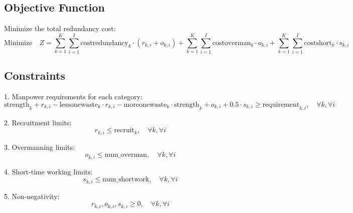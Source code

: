 \documentclass{article}
\begin{document}
\subsection*{Objective Function}
Minimize the total redundancy cost:
\[
\text{Minimize} \quad Z = \sum_{k=1}^{K} \sum_{i=1}^{I} \text{costredundancy}_{k} \cdot (r_{k,i} + o_{k,i}) + \sum_{k=1}^{K} \sum_{i=1}^{I} \text{costoverman}_{k} \cdot o_{k,i} + \sum_{k=1}^{K} \sum_{i=1}^{I} \text{costshort}_{k} \cdot s_{k,i}
\]

\subsection*{Constraints}
1. Manpower requirements for each category:
\[
\text{strength}_{k} + r_{k,i} - \text{lessonewaste}_{k} \cdot r_{k,i} - \text{moreonewaste}_{k} \cdot \text{strength}_{k} + o_{k,i} + 0.5 \cdot s_{k,i} \geq \text{requirement}_{k,i}, \quad \forall k, \forall i
\]

2. Recruitment limits:
\[
r_{k,i} \leq \text{recruit}_{k}, \quad \forall k, \forall i
\]

3. Overmanning limits:
\[
o_{k,i} \leq \text{num\_overman}, \quad \forall k, \forall i
\]

4. Short-time working limits:
\[
s_{k,i} \leq \text{num\_shortwork}, \quad \forall k, \forall i
\]

5. Non-negativity:
\[
r_{k,i}, o_{k,i}, s_{k,i} \geq 0, \quad \forall k, \forall i
\]
\end{document}
